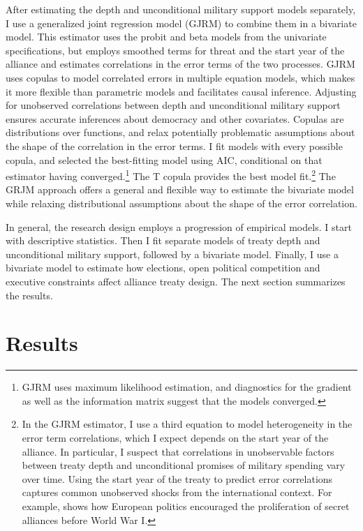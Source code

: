 \documentclass[12pt]{article}
\begin{document}
After estimating the depth and unconditional military support models separately, I use a generalized joint regression model (GJRM) \citep{Braumoelleretal2018} to combine them in a bivariate model.
This estimator uses the probit and beta models from the univariate specifications, but employs smoothed terms for threat and the start year of the alliance and estimates correlations in the error terms of the two processes. 
GJRM uses copulas to model correlated errors in multiple equation models, which makes it more flexible than parametric models and facilitates causal inference. 
Adjusting for unobserved correlations between depth and unconditional military support ensures accurate inferences about democracy and other covariates. 
Copulas are distributions over functions, and relax potentially problematic assumptions about the shape of the correlation in the error terms. 
I fit models with every possible copula, and selected the best-fitting model using AIC, conditional on that estimator having converged.\footnote{GJRM uses maximum likelihood estimation, and diagnostics for the gradient as well as the information matrix suggest that the models converged.} 
The T copula provides the best model fit.\footnote{In the GJRM estimator, I use a third equation to model heterogeneity in the error term correlations, which I expect depends on the start year of the alliance. 
In particular, I suspect that correlations in unobservable factors between treaty depth and unconditional promises of military spending vary over time. 
Using the start year of the treaty to predict error correlations captures common unobserved shocks from the international context. 
For example, \citet{Kuo2019} shows how European politics encouraged the proliferation of secret alliances before World War I.}
The GRJM approach offers a general and flexible way to estimate the bivariate model while relaxing distributional assumptions about the shape of the error correlation.  


In general, the research design employs a progression of empirical models. 
I start with descriptive statistics. 
Then I fit separate models of treaty depth and unconditional military support, followed by a bivariate model. 
Finally, I use a bivariate model to estimate how elections, open political competition and executive constraints affect alliance treaty design. 
The next section summarizes the results. 


\section{Results}
\end{document}
